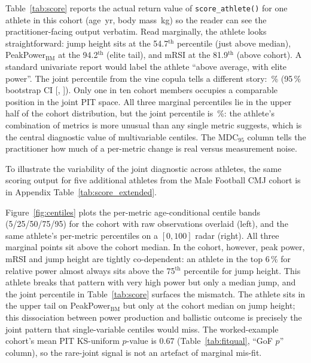 \documentclass[10pt]{article}
\begin{document}
Table~\ref{tab:score} reports the actual return value of
\texttt{score\_athlete()} for one athlete in this cohort
(age \AthleteAge{}\,yr, body mass \AthleteBM{}\,kg) so the reader can
see the practitioner-facing output verbatim. Read marginally, the
athlete looks straightforward: jump height sits at the
54.7$^{\text{th}}$ percentile (just above median),
PeakPower$_{\text{BM}}$ at the 94.2$^{\text{th}}$ (elite tail), and
mRSI at the 81.9$^{\text{th}}$ (above cohort). A standard univariate
report would label the athlete ``above average, with elite power''.
The joint percentile from the vine copula tells a different story:
\AthleteJoint{}\,\% (95\,\% bootstrap CI [\AthleteJointLo{},
\AthleteJointHi{}]). Only one in ten cohort members occupies a
comparable position in the joint PIT space. All three marginal
percentiles lie in the upper half of the cohort distribution, but the
joint percentile is \AthleteJoint{}\,\%: the athlete's combination
of metrics is more unusual than any single metric suggests, which is
the central diagnostic value of multivariable centiles. The
MDC$_{95}$ column tells the practitioner how much of a per-metric
change is real versus measurement noise.

\begin{table}[!htbp]
\centering
\small
\caption{Concrete output of \texttt{score\_athlete()} for one Male
Football CMJ athlete (age \AthleteAge{}\,yr, body mass
\AthleteBM{}\,kg). Pct is the marginal percentile from the winning
GAMLSS model; MDC$_{95}$ is the cohort minimum detectable change. The
joint percentile uses Mahalanobis depth on the PIT vector with a
non-parametric bootstrap CI.}
\label{tab:score}

\end{table}

To illustrate the variability of the joint diagnostic across
athletes, the same scoring output for five additional athletes from
the Male Football CMJ cohort is in Appendix
Table~\ref{tab:score_extended}.

Figure~\ref{fig:centiles} plots the per-metric age-conditional centile
bands (5/25/50/75/95) for the cohort with raw observations overlaid
(left), and the same athlete's per-metric percentiles on a $[0,100]$
radar (right). All three marginal points sit above the cohort median.
In the cohort, however, peak power, mRSI and jump height are tightly
co-dependent: an athlete in the top $6\,\%$ for relative power almost
always sits above the 75$^{\text{th}}$ percentile for jump height.
This athlete breaks that pattern with very high power but only a
median jump, and the joint percentile in Table~\ref{tab:score}
surfaces the mismatch. The athlete sits in the upper tail on
PeakPower$_{\text{BM}}$ but only at the cohort median on jump height;
this dissociation between power production and ballistic outcome is
precisely the joint pattern that single-variable centiles would miss.
The worked-example cohort's mean PIT KS-uniform $p$-value is $0.67$
(Table~\ref{tab:fitqual}, ``GoF $p$'' column), so the rare-joint
signal is not an artefact of marginal mis-fit.
\end{document}
